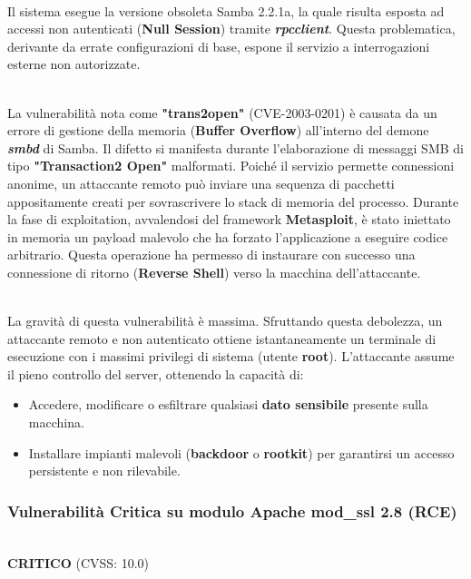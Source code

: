 \documentclass[12pt, a4paper]{article}
\begin{document}
    \\ \vspace{0.15cm}
    Il sistema esegue la versione obsoleta Samba 2.2.1a, la quale risulta esposta ad accessi non autenticati (\textbf{Null Session}) tramite \textit{\textbf{rpcclient}}. Questa problematica, derivante da errate configurazioni di base, espone il servizio a interrogazioni esterne non autorizzate.

    \vspace{0.5 cm}
    \\ \vspace{0.15cm}
    La vulnerabilità nota come \textbf{"trans2open"} (CVE-2003-0201) è causata da un errore di gestione della memoria (\textbf{Buffer Overflow}) all'interno del demone \textit{\textbf{smbd}} di Samba. Il difetto si manifesta durante l'elaborazione di messaggi SMB di tipo \textbf{"Transaction2 Open"} malformati. Poiché il servizio permette connessioni anonime, un attaccante remoto può inviare una sequenza di pacchetti appositamente creati per sovrascrivere lo stack di memoria del processo. Durante la fase di exploitation, avvalendosi del framework \textbf{Metasploit}, è stato iniettato in memoria un payload malevolo che ha forzato l'applicazione a eseguire codice arbitrario. Questa operazione ha permesso di instaurare con successo una connessione di ritorno (\textbf{Reverse Shell}) verso la macchina dell'attaccante.

    \vspace{0.5 cm}
    \\ \vspace{0.15cm}
    La gravità di questa vulnerabilità è massima. Sfruttando questa debolezza, un attaccante remoto e non autenticato ottiene istantaneamente un terminale di esecuzione con i massimi privilegi di sistema (utente \textbf{root}). L'attaccante assume il pieno controllo del server, ottenendo la capacità di:
    \begin{itemize}
        \item Accedere, modificare o esfiltrare qualsiasi \textbf{dato sensibile} presente sulla macchina.
        \item Installare impianti malevoli (\textbf{backdoor} o \textbf{rootkit}) per garantirsi un accesso persistente e non rilevabile.
    \end{itemize}

    \newpage
    \subsubsection{Vulnerabilità Critica su modulo Apache mod\_ssl 2.8 (RCE)}
    \\ \vspace{0.15cm}
    {\color{red} \textbf{CRITICO}} (CVSS: 10.0)
\end{document}
